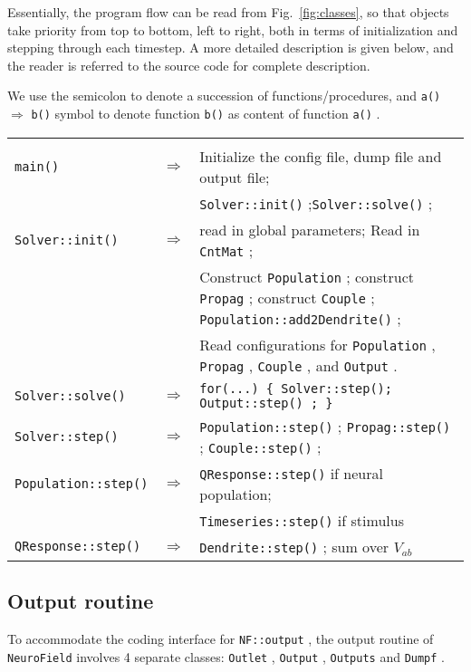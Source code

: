 \documentclass[12pt,a4paper]{article}
\newcommand{\type}[1]{{\small\small\tt #1} }
\newcommand{\NF}[0]{\type{NeuroField}}
\begin{document}
Essentially, the program flow can be read from Fig.~\ref{fig:classes}, so that objects take priority from top to bottom, left to right, both in terms of initialization and stepping through each timestep. A more detailed description is given below, and the reader is referred to the source code for complete description.

We use the semicolon to denote a succession of functions/procedures, and \type{a()} $\Rightarrow$ \type{b()} symbol to denote function \type{b()} as content of function \type{a()}.

\begin{center}
\begin{tabular}{ | l l p{11cm} | }
\hline \\

\type{main()}& $\Rightarrow$ &Initialize the config file, dump file and output file;\\[6pt]
&&\type{Solver::init()};\type{Solver::solve()};\\[6pt]
\type{Solver::init()}& $\Rightarrow$ &read in global parameters; Read in \type{CntMat};\\[6pt]
&&Construct \type{Population}; construct \type{Propag}; construct \type{Couple}; \type{Population::add2Dendrite()};\\[6pt]
&&Read configurations for \type{Population}, \type{Propag}, \type{Couple}, and \type{Output}.\\[6pt]
\type{Solver::solve()}& $\Rightarrow$ & \type{for(...) \{ Solver::step(); \type{Output::step()}; \} }\\[6pt]
\type{Solver::step()}& $\Rightarrow$ & \type{Population::step()}; \type{Propag::step()}; \type{Couple::step()};\\[6pt]
\type{Population::step()}& $\Rightarrow$ & \type{QResponse::step()} if neural population;\\[6pt]
&&\type{Timeseries::step()} if stimulus\\[6pt]
\type{QResponse::step()}& $\Rightarrow$ & \type{Dendrite::step()}; sum over \(V_{ab}\)

\\\hline
\end{tabular}
\end{center}

\subsection{Output routine}

To accommodate the coding interface for \type{NF::output}, the output routine of \NF involves 4 separate classes: \type{Outlet}, \type{Output}, \type{Outputs} and \type{Dumpf}.
\end{document}
